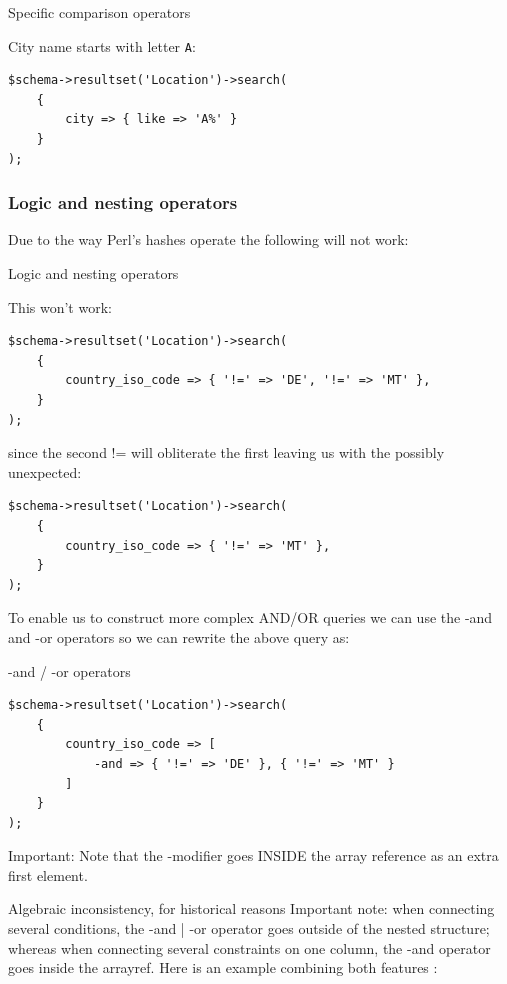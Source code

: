 \begin{frame}[fragile]{Specific comparison operators}

City name starts with letter \verb|A|:

\begin{lstlisting}
$schema->resultset('Location')->search(
    {
        city => { like => 'A%' }
    }
);
\end{lstlisting}
\end{frame}

\subsubsection{Logic and nesting operators}

Due to the way Perl's hashes operate the following will not work:

\begin{frame}[fragile]{Logic and nesting operators}

This won't work:

\begin{lstlisting}
$schema->resultset('Location')->search(
    {
        country_iso_code => { '!=' => 'DE', '!=' => 'MT' },
    }
);
\end{lstlisting}

since the second != will obliterate the first leaving us with the possibly
unexpected:

\begin{lstlisting}
$schema->resultset('Location')->search(
    {
        country_iso_code => { '!=' => 'MT' },
    }
);
\end{lstlisting}
\end{frame}

To enable us to construct more complex AND/OR queries we can use the -and and -or operators so we can rewrite the above query as:

\begin{frame}[fragile]{-and / -or operators}
\begin{lstlisting}
$schema->resultset('Location')->search(
    {
        country_iso_code => [
            -and => { '!=' => 'DE' }, { '!=' => 'MT' }
        ]
    }
);
\end{lstlisting}
\end{frame}

Important: Note that the -modifier goes INSIDE the array reference as an extra first element. 

Algebraic inconsistency, for historical reasons
Important note: when connecting several conditions, the -and | -or operator goes outside of the nested structure; whereas when connecting several constraints on one column, the -and operator goes inside the arrayref. Here is an example combining both features :

